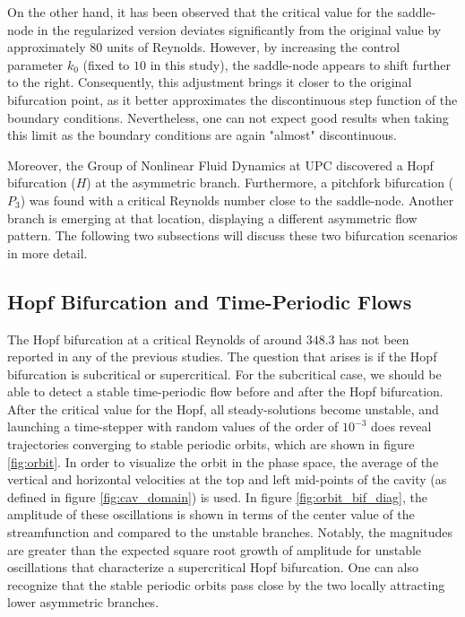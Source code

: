 On the other hand, it has been observed that the critical value for the
saddle-node in the regularized version deviates significantly from the original
value by approximately $80$ units of Reynolds. However, by increasing the
control parameter $k_0$ (fixed to $10$ in this study), the saddle-node appears
to shift further to the right. Consequently, this adjustment brings it closer
to the original bifurcation point, as it better approximates the discontinuous
step function of the boundary conditions. Nevertheless, one can not expect good
results when taking this limit as the boundary conditions are again "almost"
discontinuous.

Moreover, the Group of Nonlinear Fluid Dynamics at UPC discovered a Hopf
bifurcation ($H$) at the asymmetric branch. Furthermore, a pitchfork
bifurcation ($P_3$) was found with a critical Reynolds number close to the
saddle-node. Another branch is emerging at that location, displaying a
different asymmetric flow pattern. The following two subsections will discuss
these two bifurcation scenarios in more detail. 

\subsection{Hopf Bifurcation and Time-Periodic Flows}

The Hopf bifurcation at a critical Reynolds of around $348.3$ has not been
reported in any of the previous studies. The question that arises is if the
Hopf bifurcation is subcritical or supercritical. For the subcritical case, we
should be able to detect a stable time-periodic flow before and after the Hopf
bifurcation. After the critical value for the Hopf, all steady-solutions become
unstable, and launching a time-stepper with random values of the order of
$10^{-3}$ does reveal trajectories converging to stable periodic orbits, which
are shown in figure \ref{fig:orbit}. In order to visualize the orbit in the
phase space, the average of the vertical and horizontal velocities at the top
and left mid-points of the cavity (as defined in figure \ref{fig:cav_domain})
is used. In figure \ref{fig:orbit_bif_diag}, the amplitude of these
oscillations is shown in terms of the center value of the streamfunction and
compared to the unstable branches. Notably, the magnitudes are greater than the
expected square root growth of amplitude for unstable oscillations that
characterize a supercritical Hopf bifurcation. One can also recognize that the
stable periodic orbits pass close by the two locally attracting lower
asymmetric branches.

